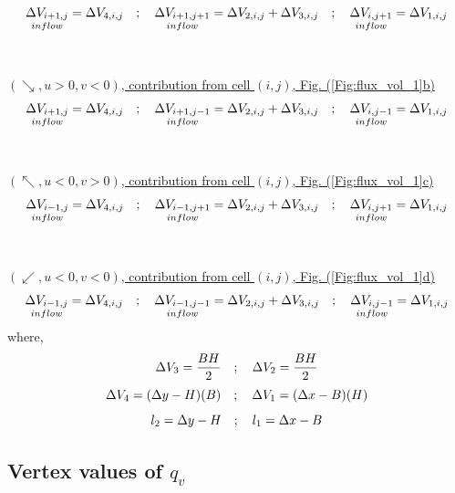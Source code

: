 \documentclass[fleqn]{article}
\begin{document}
{\[  \underset{inflow}{\Delta V_{i+1,j}}      = \delV_{4,i,j} 
    \quad ; \quad 
    \underset{inflow}{\Delta V_{i+1,j+1}}    = \delV_{2,i,j} + \delV_{3,i,j}
    \quad ; \quad 
    \underset{inflow}{\Delta V_{i,j+1}}      = \delV_{1,i,j}\]
%
\\
\\
\underline{$(\searrow, u > 0, v < 0)$, contribution from cell $(i, j)$, Fig. (\ref{Fig:flux_vol_1}b)}
\\
\[  \underset{inflow}{\Delta V_{i+1,j}}      = \delV_{4,i,j}
    \quad ; \quad 
    \underset{inflow}{\Delta V_{i+1,j-1}}    = \delV_{2,i,j} + \delV_{3,i,j}
    \quad ; \quad 
    \underset{inflow}{\Delta V_{i,j-1}}      = \delV_{1,i,j}\]
%
%
\\
\\
\underline{$(\nwarrow, u < 0, v > 0)$, contribution from cell $(i, j)$, Fig. (\ref{Fig:flux_vol_1}c)}
\\
\[  \underset{inflow}{\Delta V_{i-1,j}}      = \delV_{4,i,j}  
    \quad ; \quad 
    \underset{inflow}{\Delta V_{i-1,j+1}}    = \delV_{2,i,j} + \delV_{3,i,j}
    \quad ; \quad 
    \underset{inflow}{\Delta V_{i,j+1}}      = \delV_{1,i,j}\]
%
\\
\\
\underline{$(\swarrow, u < 0, v < 0)$, contribution from cell $(i, j)$, Fig. (\ref{Fig:flux_vol_1}d)}
\\
\[  \underset{inflow}{\Delta V_{i-1,j}}      = \delV_{4,i,j}  
    \quad ; \quad 
    \underset{inflow}{\Delta V_{i-1,j-1}}    = \delV_{2,i,j} + \delV_{3,i,j}
    \quad ; \quad 
    \underset{inflow}{\Delta V_{i,j-1}}      = \delV_{1,i,j}\]
%
%
where,
\[  \delV_3 = \frac{BH}{2}      \quad;  \quad  \delV_2 = \frac{BH}{2}\]
\[  \delV_4 = (\dely - H)(B)            \quad;  \quad  \delV_1 = (\delx - B)(H)\]
\[  l_2 = \dely - H             \quad;  \quad   l_1 = \delx - B \]
%
%
%
\subsection{Vertex values of $q_v$}

}
\end{document}
